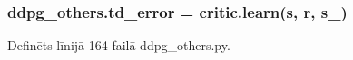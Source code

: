 \subsubsection[{\texorpdfstring{td\+\_\+error}{td_error}}]{\setlength{\rightskip}{0pt plus 5cm}ddpg\+\_\+others.\+td\+\_\+error = critic.\+learn({\bf s}, {\bf r}, {\bf s\+\_\+})}\hypertarget{namespaceddpg__others_ab3de6bd8c4c05cda51f8fb396eb255d8}{}\label{namespaceddpg__others_ab3de6bd8c4c05cda51f8fb396eb255d8}


Definēts līnijā 164 failā ddpg\+\_\+others.\+py.

